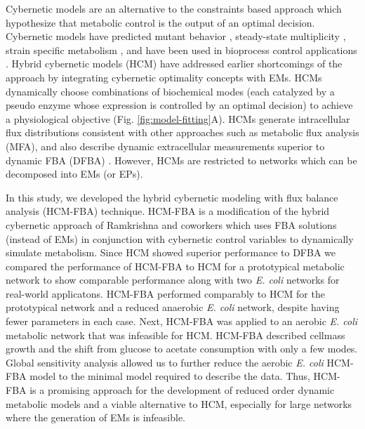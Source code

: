 \documentclass[10pt,twocolumn,twoside,final]{IEEEtran}
\begin{document}
Cybernetic models are an alternative to the constraints based approach which hypothesize that metabolic control is the output of an optimal decision.
Cybernetic models have predicted mutant behavior \cite{1999_varner_ramkrishna_MetaEng,Song:2012aa}, steady-state multiplicity \cite{2012_kim_ramkrishna_BiotechProg}, strain specific metabolism \cite{Song:2011aa}, and have been used in bioprocess control applications \cite{Gadkar:2003aa}.
Hybrid cybernetic models (HCM) have addressed earlier shortcomings of the approach by integrating cybernetic optimality concepts with EMs.
HCMs dynamically choose combinations of biochemical modes (each catalyzed by a pseudo enzyme whose expression is controlled by an optimal decision) to achieve a physiological objective (Fig. \ref{fig:model-fitting}A).
HCMs generate intracellular flux distributions consistent with other approaches such as metabolic flux analysis (MFA), and also describe dynamic extracellular measurements superior to dynamic FBA (DFBA) \cite{2008_kim_varner_ramkrishna_BiotechProg}.
However, HCMs are restricted to networks which can be decomposed into EMs (or EPs).


In this study, we developed the hybrid cybernetic modeling with flux balance analysis (HCM-FBA) technique.
HCM-FBA is a modification of the hybrid cybernetic approach of Ramkrishna and coworkers \cite{2008_kim_varner_ramkrishna_BiotechProg} which uses FBA solutions
(instead of EMs) in conjunction with cybernetic control variables to dynamically simulate metabolism.
Since HCM showed superior performance to DFBA we compared the performance of HCM-FBA to HCM for a prototypical metabolic network to show comparable performance along with two \emph{E. coli} networks for real-world applicatons.
HCM-FBA performed comparably to HCM for the prototypical network and a reduced anaerobic \textit{E. coli} network, despite having fewer parameters in each case.
Next, HCM-FBA was applied to an aerobic \textit{E. coli} metabolic network that was infeasible for HCM.
HCM-FBA described cellmass growth and the shift from glucose to acetate consumption with only a few modes.
Global sensitivity analysis allowed us to further reduce the aerobic \textit{E. coli} HCM-FBA model to the minimal model required to describe the data.
Thus, HCM-FBA is a promising approach for the development of reduced order dynamic metabolic models
and a viable alternative to HCM, especially for large networks where the generation of EMs is infeasible.
\end{document}
